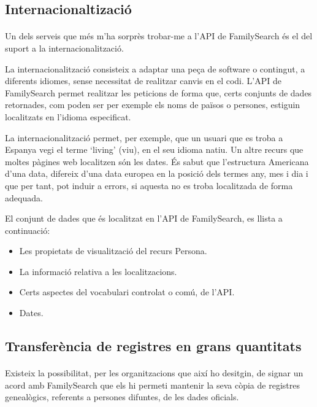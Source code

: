     \subsection{Internacionaltizació}

        \paragraph{}
        Un dels serveis que més m'ha sorprès trobar-me a l'API de FamilySearch és el del suport a la internacionalització.

        La internacionalització consisteix a adaptar una peça de software o contingut, a diferents idiomes, sense necessitat de realitzar canvis en el codi. L'API de Family\-Search permet realitzar les peticions de forma que, certs conjunts de dades re\-tor\-na\-des, com poden ser per exemple els noms de països o persones, estiguin localitzats en l'idioma especificat.

        La internacionalització permet, per exemple, que un usuari que es troba a Espanya vegi el terme `living' (viu), en el seu idioma natiu. Un altre recurs que moltes pàgines web localitzen són les dates. És sabut que l'estructura Americana d'una data, difereix d'una data europea en la posició dels termes any, mes i dia i que per tant, pot induir a errors, si aquesta no es troba localitzada de forma adequada.

        El conjunt de dades que és localitzat en l'API de FamilySearch, es llista a continuació:

        \begin{itemize}
            \item Les propietats de visualització del recurs Persona.
            \item La informació relativa a les localitzacions.
            \item Certs aspectes del vocabulari controlat o comú, de l'API.
            \item Dates.
        \end{itemize}


    \subsection{Transferència de registres en grans quantitats}

        \paragraph{}
        Existeix la possibilitat, per les organitzacions que així ho desitgin, de signar un acord amb FamilySearch que els hi permeti mantenir la seva còpia de registres genealògics, referents a persones difuntes, de les dades oficials.

